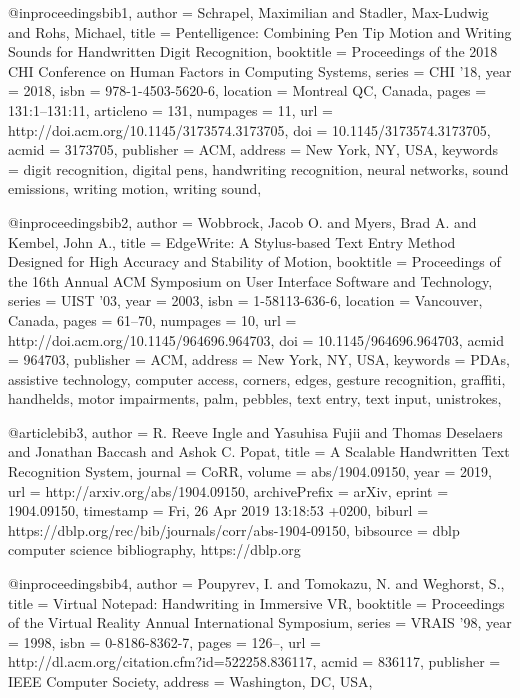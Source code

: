 

@inproceedings{bib1,
 author = {Schrapel, Maximilian and Stadler, Max-Ludwig and Rohs, Michael},
 title = {Pentelligence: Combining Pen Tip Motion and Writing Sounds for Handwritten Digit Recognition},
 booktitle = {Proceedings of the 2018 CHI Conference on Human Factors in Computing Systems},
 series = {CHI '18},
 year = {2018},
 isbn = {978-1-4503-5620-6},
 location = {Montreal QC, Canada},
 pages = {131:1--131:11},
 articleno = {131},
 numpages = {11},
 url = {http://doi.acm.org/10.1145/3173574.3173705},
 doi = {10.1145/3173574.3173705},
 acmid = {3173705},
 publisher = {ACM},
 address = {New York, NY, USA},
 keywords = {digit recognition, digital pens, handwriting recognition, neural networks, sound emissions, writing motion, writing sound},
} 

@inproceedings{bib2,
 author = {Wobbrock, Jacob O. and Myers, Brad A. and Kembel, John A.},
 title = {EdgeWrite: A Stylus-based Text Entry Method Designed for High Accuracy and Stability of Motion},
 booktitle = {Proceedings of the 16th Annual ACM Symposium on User Interface Software and Technology},
 series = {UIST '03},
 year = {2003},
 isbn = {1-58113-636-6},
 location = {Vancouver, Canada},
 pages = {61--70},
 numpages = {10},
 url = {http://doi.acm.org/10.1145/964696.964703},
 doi = {10.1145/964696.964703},
 acmid = {964703},
 publisher = {ACM},
 address = {New York, NY, USA},
 keywords = {PDAs, assistive technology, computer access, corners, edges, gesture recognition, graffiti, handhelds, motor impairments, palm, pebbles, text entry, text input, unistrokes},
} 

@article{bib3,
  author    = {R. Reeve Ingle and
               Yasuhisa Fujii and
               Thomas Deselaers and
               Jonathan Baccash and
               Ashok C. Popat},
  title     = {A Scalable Handwritten Text Recognition System},
  journal   = {CoRR},
  volume    = {abs/1904.09150},
  year      = {2019},
  url       = {http://arxiv.org/abs/1904.09150},
  archivePrefix = {arXiv},
  eprint    = {1904.09150},
  timestamp = {Fri, 26 Apr 2019 13:18:53 +0200},
  biburl    = {https://dblp.org/rec/bib/journals/corr/abs-1904-09150},
  bibsource = {dblp computer science bibliography, https://dblp.org}
}

@inproceedings{bib4,
 author = {Poupyrev, I. and Tomokazu, N. and Weghorst, S.},
 title = {Virtual Notepad: Handwriting in Immersive VR},
 booktitle = {Proceedings of the Virtual Reality Annual International Symposium},
 series = {VRAIS '98},
 year = {1998},
 isbn = {0-8186-8362-7},
 pages = {126--},
 url = {http://dl.acm.org/citation.cfm?id=522258.836117},
 acmid = {836117},
 publisher = {IEEE Computer Society},
 address = {Washington, DC, USA},
} 

